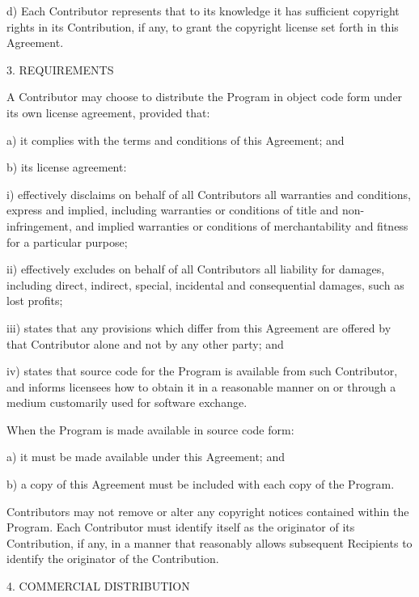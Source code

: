 d) Each Contributor represents that to its knowledge it has sufficient
copyright rights in its Contribution, if any, to grant the copyright
license set forth in this Agreement.


3. REQUIREMENTS

A Contributor may choose to distribute the Program in object
code form under its own license agreement, provided that:

a) it complies with the terms and conditions of this Agreement;
and

b) its license agreement:

i) effectively disclaims on behalf of all Contributors all warranties
and conditions, express and implied, including warranties or
conditions of title and non-infringement, and implied warranties
or conditions of merchantability and fitness for a particular
purpose;

ii) effectively excludes on behalf of all Contributors all liability
for damages, including direct, indirect, special, incidental
and consequential damages, such as lost profits;

iii) states that any provisions which differ from this Agreement
are offered by that Contributor alone and not by any other party;
and

iv) states that source code for the Program is available from
such Contributor, and informs licensees how to obtain it in a
reasonable manner on or through a medium customarily used for
software exchange.


When the Program is made available in source code form:

a) it must be made available under this Agreement; and

b) a copy of this Agreement must be included with each copy of
the Program.

Contributors may not remove or alter any copyright notices contained
within the Program.
Each Contributor must identify itself as the originator of its
Contribution, if any, in a manner that reasonably allows subsequent
Recipients to identify the originator of the Contribution.


4. COMMERCIAL DISTRIBUTION

